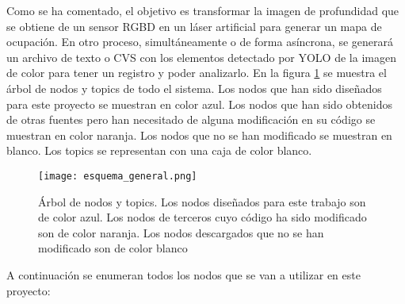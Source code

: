 Como se ha comentado, el objetivo es transformar la imagen de profundidad que se obtiene de un sensor RGBD en un láser artificial para generar un mapa de ocupación. En otro proceso, simultáneamente o de forma asíncrona, se generará un archivo de texto o CVS con los elementos detectado por YOLO de la imagen de color para tener un registro y poder analizarlo. En la figura \ref{fig:esq_general} se muestra el árbol de nodos y topics de todo el sistema. Los nodos que han sido diseñados para este proyecto se muestran en color azul. Los nodos que han sido obtenidos de otras fuentes pero han necesitado de alguna modificación en su código se muestran en color naranja. Los nodos que no se han modificado se muestran en blanco. Los topics se representan con una caja de color blanco.\\

\begin{figure}[h]
	\begin{center} 
		\texttt{[image: esquema\_general.png]}
	\end{center}
	\caption{Árbol de nodos y topics. Los nodos diseñados para este trabajo son de color azul. Los nodos de terceros cuyo código ha sido modificado son de color naranja. Los nodos descargados que no se han modificado son de color blanco}
	\label{fig:esq_general}
\end{figure}

A continuación se enumeran todos los nodos que se van a utilizar en este proyecto:

